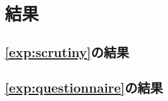 \section{結果}
	\subsection{\ref{exp:scrutiny}の結果}
	
	
	
	
	\subsection{\ref{exp:questionnaire}の結果}
	
	
	
	
